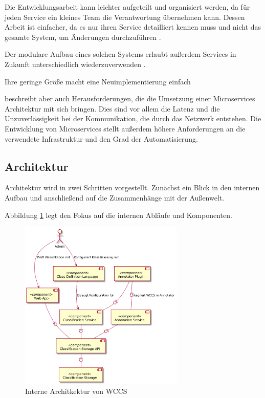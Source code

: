         Die Entwicklungsarbeit kann leichter aufgeteilt und organisiert werden,
        da für jeden Service ein kleines Team die Verantwortung übernehmen kann.
        Dessen Arbeit ist einfacher, da es nur ihren Service detailliert kennen muss
        und nicht das gesamte System, um Änderungen durchzuführen
        \cite[Kapitel 1.2.5]{newman:microservices}.

        Der modulare Aufbau eines solchen Systems erlaubt außerdem Services
        in Zukunft unterschiedlich wiederzuverwenden
        \cite[Kapitel 1.2.6]{newman:microservices}.

        Ihre geringe Größe macht eine Neuimplementierung einfach
        \cite[Kapitel 1.2.7]{newman:microservices}

        \citet[Kapitel 6.1-6.3]{wolff:microservices} beschreibt aber auch
        Herausforderungen, die die Umsetzung einer Microservices Architektur mit sich bringen.
        Dies sind vor allem die Latenz und die Unzuverlässigkeit bei der Kommunikation,
        die durch das Netzwerk entstehen.
        Die Entwicklung von Microservices stellt außerdem höhere Anforderungen an die
        verwendete Infrastruktur und den Grad der Automatisierung.

    \subsection{Architektur}
        Architektur wird in zwei Schritten vorgestellt.
        Zunächst ein Blick in den internen Aufbau und anschließend auf die Zusammenhänge mit der Außenwelt.
        
        Abbildung \ref{image:wccsInternalArchitecture} legt den Fokus auf die
        internen Abläufe und Komponenten.

        \begin{figure}
            \centering
            \includegraphics[width=0.7\textwidth]{../resources/architecture/wccs_internal_architecture.png}
            \caption{Interne Architkektur von WCCS}
            \label{image:wccsInternalArchitecture}
        \end{figure}


